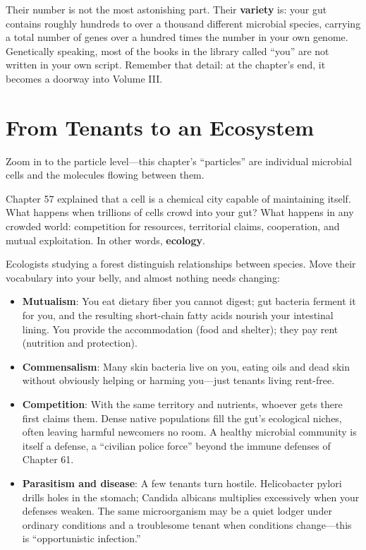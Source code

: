 Their number is not the most astonishing part. Their \textbf{variety} is: your gut contains roughly hundreds to over a thousand different microbial species, carrying a total number of genes over a hundred times the number in your own genome. Genetically speaking, most of the books in the library called ``you'' are not written in your own script. Remember that detail: at the chapter's end, it becomes a doorway into Volume III.

\section{From Tenants to an Ecosystem}

Zoom in to the particle level---this chapter's ``particles'' are individual microbial cells and the molecules flowing between them.

Chapter 57 explained that a cell is a chemical city capable of maintaining itself. What happens when trillions of cells crowd into your gut? What happens in any crowded world: competition for resources, territorial claims, cooperation, and mutual exploitation. In other words, \textbf{ecology}.

Ecologists studying a forest distinguish relationships between species. Move their vocabulary into your belly, and almost nothing needs changing:

\begin{itemize}[itemsep=2pt]
\item \textbf{Mutualism}: You eat dietary fiber you cannot digest; gut bacteria ferment it for you, and the resulting short-chain fatty acids nourish your intestinal lining. You provide the accommodation (food and shelter); they pay rent (nutrition and protection).
\item \textbf{Commensalism}: Many skin bacteria live on you, eating oils and dead skin without obviously helping or harming you---just tenants living rent-free.
\item \textbf{Competition}: With the same territory and nutrients, whoever gets there first claims them. Dense native populations fill the gut's ecological niches, often leaving harmful newcomers no room. A healthy microbial community is itself a defense, a ``civilian police force'' beyond the immune defenses of Chapter 61.
\item \textbf{Parasitism and disease}: A few tenants turn hostile. Helicobacter pylori drills holes in the stomach; Candida albicans multiplies excessively when your defenses weaken. The same microorganism may be a quiet lodger under ordinary conditions and a troublesome tenant when conditions change---this is ``opportunistic infection.''
\end{itemize}

